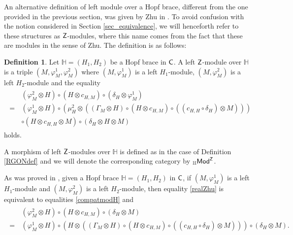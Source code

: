 \documentclass[11pt,reqno]{amsart}
\theoremstyle{plain}%
\theoremstyle{definition}
\newtheorem{definition}[theorem]{Definition}%
\theoremstyle{remark}
\begin{document}
An alternative definition of left module over a Hopf brace, different from the one provided in the previous section, was given by Zhu in \cite[Definition 3.1]{ZHU}. To avoid confusion with the notion considered in Section \ref{sec_equivalence}, we will henceforth refer to these structures as ${\sf Z}$-modules, where this name comes from the fact that these are modules in the sense of Zhu. The definition is as follows:
\begin{definition}	\label{ZHUdef}
	Let $\mathbb{H}=(H_{1},H_{2})$ be a Hopf brace in ${\sf C}$. A left ${\sf Z}$-module over $\mathbb{H}$ is a triple $(M,\varphi_{M}^{1},\varphi_{M}^{2})$ where $(M,\varphi_{M}^{1})$ is a left $H_{1}$-module, $(M,\varphi_{M}^{2})$ is a left $H_{2}$-module and the equality 	
\begin{align}\label{realZhu}
		\begin{split}
		&(\varphi_{M}^{2}\otimes H)\circ (H\otimes c_{H,M})\circ(\delta_{H}\otimes\varphi_{M}^{1})\\=\,&(\varphi_{M}^{1}\otimes H)\circ(\mu_{H}^{2}\otimes((\Gamma_{M}\otimes H)\circ (H\otimes c_{H,M})\circ ((c_{H,H}\circ\delta_{H})\otimes M)))\\&\circ(H\otimes c_{H,H}\otimes M)\circ (\delta_{H}\otimes H\otimes M)
		\end{split}
\end{align}  
	holds.
	
	A morphism of left ${\sf Z}$-modules over $\mathbb{H}$ is defined as in the case of Definition \ref{RGONdef} and we will denote the corresponding category  by ${}_{\mathbb{H}}{\sf Mod}^{{\sf Z}}$. 
\end{definition}

As was proved in \cite[Lemma 3.2]{ZHU}, given a Hopf brace $\mathbb{H}=(H_{1},H_{2})$ in ${\sf C}$, if $(M,\varphi_{M}^{1})$ is a left $H_{1}$-module and $(M,\varphi_{M}^{2})$ is a left $H_{2}$-module, then equality \eqref{realZhu} is equivalent to equalities \eqref{compatmodH} and  
\begin{align}\label{condModZhu}
\begin{split}
&(\varphi_{M}^{2}\otimes H)\circ(H\otimes c_{H,M})\circ(\delta_{H}\otimes M)\\=\,&(\varphi_{M}^{1}\otimes H)\circ(H\otimes((\Gamma_{M}\otimes H)\circ (H\otimes c_{H,M})\circ ((c_{H,H}\circ\delta_{H})\otimes M)))\circ(\delta_{H}\otimes M).
\end{split}
\end{align}  
	
\end{document}
